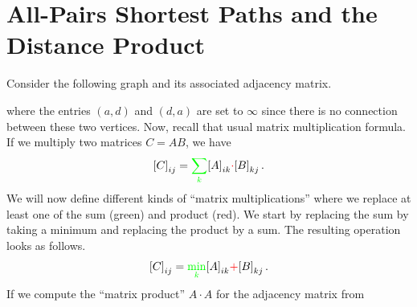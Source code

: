 \section{All-Pairs Shortest Paths and the Distance Product}
Consider the following graph and its associated adjacency matrix.
\begin{figure}[h!]
  \centering
\end{figure}
where the entries $(a,d)$ and $(d,a)$ are set to $\infty$ since there is no
connection between these two vertices. Now, recall that usual matrix
multiplication formula. If we multiply two matrices $C = AB$, we have
\begin{equation*}
  {[C]}_{ij} = {\color{green}\sum_k} {[A]}_{ik} {\color{red}\cdot} {[B]}_{kj}\,.
\end{equation*}
We will now define different kinds of ``matrix multiplications'' where we
replace at least one of the sum (green) and product (red). We start by replacing
the sum by taking a minimum and replacing the product by a sum. The resulting
operation looks as follows.
\begin{equation*}
  {[C]}_{ij} = {\color{green}\min_k} {[A]}_{ik} {\color{red}+} {[B]}_{kj}\,.
\end{equation*}
If we compute the ``matrix product'' $A \cdot A$ for the adjacency matrix from
